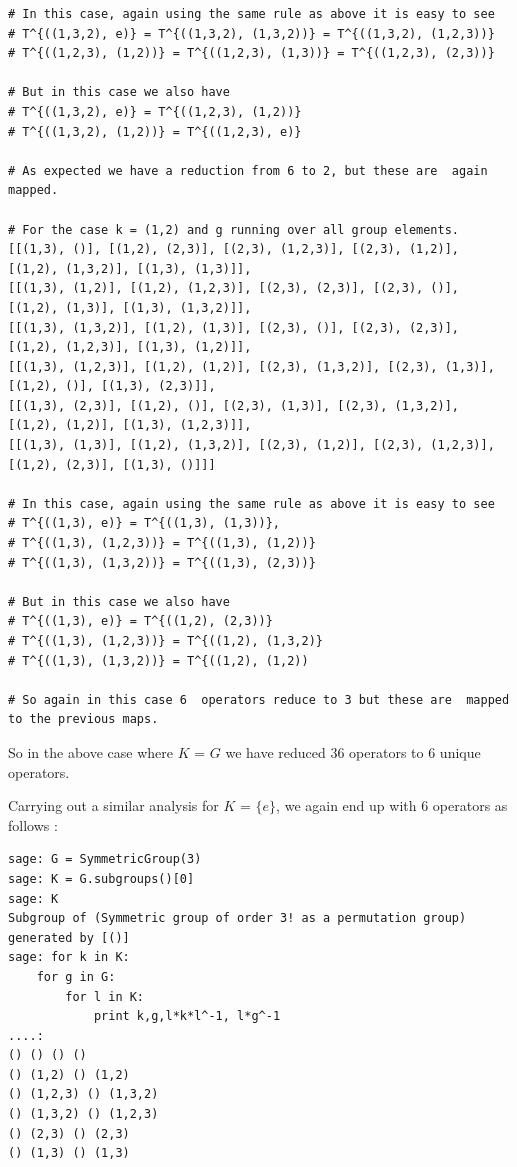 \begin{lstlisting}[frame=single]
# In this case, again using the same rule as above it is easy to see
# T^{((1,3,2), e)} = T^{((1,3,2), (1,3,2))} = T^{((1,3,2), (1,2,3))}
# T^{((1,2,3), (1,2))} = T^{((1,2,3), (1,3))} = T^{((1,2,3), (2,3))}

# But in this case we also have 
# T^{((1,3,2), e)} = T^{((1,2,3), (1,2))}
# T^{((1,3,2), (1,2))} = T^{((1,2,3), e)}

# As expected we have a reduction from 6 to 2, but these are  again mapped.

# For the case k = (1,2) and g running over all group elements.
[[(1,3), ()], [(1,2), (2,3)], [(2,3), (1,2,3)], [(2,3), (1,2)],
[(1,2), (1,3,2)], [(1,3), (1,3)]],
[[(1,3), (1,2)], [(1,2), (1,2,3)], [(2,3), (2,3)], [(2,3), ()],
[(1,2), (1,3)], [(1,3), (1,3,2)]],
[[(1,3), (1,3,2)], [(1,2), (1,3)], [(2,3), ()], [(2,3), (2,3)],
[(1,2), (1,2,3)], [(1,3), (1,2)]],
[[(1,3), (1,2,3)], [(1,2), (1,2)], [(2,3), (1,3,2)], [(2,3), (1,3)],
[(1,2), ()], [(1,3), (2,3)]],
[[(1,3), (2,3)], [(1,2), ()], [(2,3), (1,3)], [(2,3), (1,3,2)],
[(1,2), (1,2)], [(1,3), (1,2,3)]],
[[(1,3), (1,3)], [(1,2), (1,3,2)], [(2,3), (1,2)], [(2,3), (1,2,3)],
[(1,2), (2,3)], [(1,3), ()]]]

# In this case, again using the same rule as above it is easy to see
# T^{((1,3), e)} = T^{((1,3), (1,3))}, 
# T^{((1,3), (1,2,3))} = T^{((1,3), (1,2))} 
# T^{((1,3), (1,3,2))} = T^{((1,3), (2,3))} 

# But in this case we also have 
# T^{((1,3), e)} = T^{((1,2), (2,3))}
# T^{((1,3), (1,2,3))} = T^{((1,2), (1,3,2)}
# T^{((1,3), (1,3,2))} = T^{((1,2), (1,2))

# So again in this case 6  operators reduce to 3 but these are  mapped to the previous maps.

\end{lstlisting}

So in the above case where $K$ = $G$ we have reduced 36 operators to 6 unique operators.

Carrying out a similar analysis for $K$ = $\{e\}$, we again end up with 6 operators as follows :

\begin{lstlisting}[frame=single]
sage: G = SymmetricGroup(3)
sage: K = G.subgroups()[0]
sage: K
Subgroup of (Symmetric group of order 3! as a permutation group) generated by [()]
sage: for k in K:
    for g in G:
        for l in K:
            print k,g,l*k*l^-1, l*g^-1
....: 
() () () ()
() (1,2) () (1,2)
() (1,2,3) () (1,3,2)
() (1,3,2) () (1,2,3)
() (2,3) () (2,3)
() (1,3) () (1,3)
\end{lstlisting}

